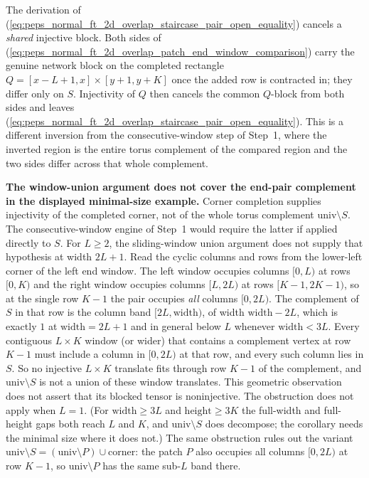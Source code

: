 \documentclass{article}
\begin{document}
The derivation of
(\ref{eq:peps_normal_ft_2d_overlap_staircase_pair_open_equality}) cancels a
\emph{shared} injective block. Both
sides of (\ref{eq:peps_normal_ft_2d_overlap_patch_end_window_comparison}) carry the genuine network block on the
completed rectangle $Q = [x-L+1,x] \times [y+1,y+K]$ once the added row
is contracted in; they differ only on $S$. Injectivity of $Q$ then
cancels the common $Q$-block from both sides and leaves (\ref{eq:peps_normal_ft_2d_overlap_staircase_pair_open_equality}). This is a different inversion from the consecutive-window step of
Step~1, where the inverted region is the entire torus complement of the
compared region and the two sides differ across that whole complement.

\medskip
\noindent\textbf{The window-union argument does not cover the end-pair
    complement in the displayed minimal-size example.} Corner completion
supplies injectivity of the completed corner, not of the whole torus
complement $\mathrm{univ}\setminus S$. The consecutive-window engine of
Step~1 would require the latter if applied directly to $S$.
For $L\geq2$, the sliding-window union argument does not supply that
hypothesis at width $2L+1$. Read the cyclic columns and rows from the lower-left corner of the
left end window. The left window occupies columns $[0,L)$ at rows
$[0,K)$ and the right window occupies columns $[L,2L)$ at rows
$[K-1,2K-1)$, so at the single row $K-1$ the pair occupies \emph{all}
columns $[0,2L)$. The complement of $S$ in that row is the column band
$[2L, \mathrm{width})$, of width $\mathrm{width} - 2L$, which is exactly
$1$ at $\mathrm{width} = 2L+1$ and in general below $L$ whenever
$\mathrm{width} < 3L$. Every contiguous $L \times K$ window (or wider) that
contains a complement vertex at row $K-1$ must include a column in
$[0,2L)$ at that row, and every such column lies in $S$. So no injective
$L \times K$ translate fits through row $K-1$ of the complement, and
$\mathrm{univ} \setminus S$ is not a union of these window translates.
This geometric observation does not assert that its blocked tensor is
noninjective. The obstruction does not apply when $L=1$.
(For $\mathrm{width} \geq 3L$ and
$\mathrm{height} \geq 3K$ the full-width and full-height gaps both reach
$L$ and $K$, and $\mathrm{univ} \setminus S$ does decompose; the corollary
needs the minimal size where it does not.) The same obstruction rules out
the variant $\mathrm{univ} \setminus S = (\mathrm{univ} \setminus P) \cup
    \mathrm{corner}$: the patch $P$ also occupies all columns $[0,2L)$ at row
$K-1$, so $\mathrm{univ} \setminus P$ has the same sub-$L$ band there.
\end{document}
